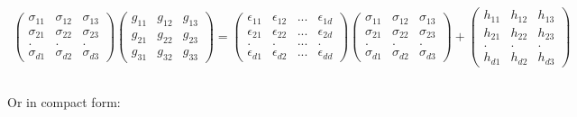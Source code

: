 \documentclass[10pt]{article}
\begin{document}
\begin{equation} \label{action_onq}
\begin{array} {l}
\left( {\begin{array}{*{15}{c}}
	\sigma_{11}   &\sigma_{12}    &\sigma_{13}\\
	\sigma_{21}   &\sigma_{22}    &\sigma_{23}\\
	.          &.              &    .      \\
	\sigma_{d1   }&\sigma_{d2}    &\sigma_{d3} 
	\end{array}} \right)  
\left( {\begin{array}{*{15}{c}}
	g_{11}   &g_{12}    &g_{13}\\
	g_{21}   &g_{22}    &g_{23}\\
	g_{31}   &g_{32}    &g_{33} 
	\end{array}} \right)=  
\left( {\begin{array}{*{15}{c}}
	\epsilon_{11}   &\epsilon_{12}  & ...   &\epsilon_{1d}\\
	\epsilon_{21}   &\epsilon_{22}  & ...   &\epsilon_{2d}\\
	.            &.              & ...   &    .      \\
	\epsilon_{d1}   &\epsilon_{d2}  & ...   &\epsilon_{dd} 
	\end{array}} \right)
\left( {\begin{array}{*{15}{c}}
	\sigma_{11}   &\sigma_{12}    &\sigma_{13}\\
	\sigma_{21}   &\sigma_{22}    &\sigma_{23}\\
	.          &.              &    .      \\
	\sigma_{d1   }&\sigma_{d2}    &\sigma_{d3} 
	\end{array}} \right)  +
\left( {\begin{array}{*{20}{c}}
	h_{11}    &h_{12}    &h_{13}\\
	h_{21}     &h_{22}    &h_{23}\\
	.          &.         &    . \\
	h_{d1}     &h_{d2}    &h_{d3} 
	\end{array}} \right) \\ \\
\end{array}
\end{equation} 

Or in compact form:
\end{document}
